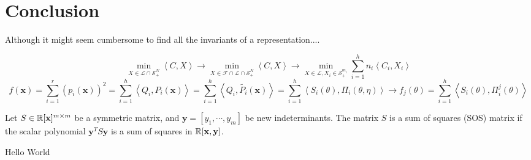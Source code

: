 \documentclass[]{article}
\begin{document}
\section{Conclusion}
Although it might seem cumbersome to find all the invariants of a representation.... 



\[ \min_{X\in\mathcal{L}\cap \mathcal{S}_+^N } \left<C,X\right> \rightarrow 
\min_{X\in\mathcal{F}\cap\mathcal{L}\cap \mathcal{S}_+^N } \left<C,X\right> \rightarrow
\min_{X\in\mathcal{L}, X_i \in \mathcal{S}_+^{m_i} }\sum_{i=1}^{h} n_i\left<C_i,X_i\right>\]
\[f(\mathbf{x}) = \sum_{i= 1}^{r} (p_i(\mathbf{x}))^2 
                = \sum_{i=1}^{h}\left<Q_i,P_i(\mathbf{x})\right> 
                = \sum_{i=1}^{h}\left<Q_i,\tilde{P_i}(\mathbf{x})\right>
                = \sum_{i=1}^{h}\left<S_i(\theta),\Pi_i(\theta,\eta)\right> 
                \rightarrow f_j(\theta) = \sum_{i=1}^{h}\left<S_i(\theta),\Pi_i^j(\theta)\right>  \]

\begin{definition}
    Let $S\in \mathbb R[\textbf{x}]^{m\times m}$ be a symmetric matrix, and $\textbf{y} = [y_1,\cdots,y_m]$ be new indeterminants. The matrix $S$ is a sum of squares (SOS) matrix if the scalar polynomial $\textbf{y}^TS\textbf{y}$ 
    is a sum of squares in $\mathbb R[\textbf{x},\textbf{y}]$.   
\end{definition}

\begin{definition}
    
\end{definition}

\cite{Gatermann_2004}



Hello World
\end{document}
